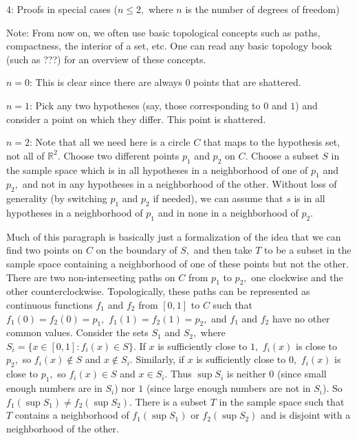 \documentclass{article}
\begin{document}
4: Proofs in special cases ($n \le 2,$ where $n$ is the number of degrees of freedom)

Note: From now on, we often use basic topological concepts such as paths, compactness, the interior of a set, etc. One can read any basic topology book (such as ???) for an overview of these concepts.

$n = 0$: This is clear since there are always $0$ points that are shattered.

$n = 1$: Pick any two hypotheses (say, those corresponding to $0$ and $1$) and consider a point on which they differ. This point is shattered.

$n = 2$: Note that all we need here is a circle $C$ that maps to the hypothesis set, not all of $\mathbb{R}^2.$ Choose two different points $p_1$ and $p_2$ on $C.$ Choose a subset $S$ in the sample space which is in all hypotheses in a neighborhood of one of $p_1$ and $p_2,$ and not in any hypotheses in a neighborhood of the other. Without loss of generality (by switching $p_1$ and $p_2$ if needed), we can assume that $s$ is in all hypotheses in a neighborhood of $p_1$ and in none in a neighborhood of $p_2.$

Much of this paragraph is basically just a formalization of the idea that we can find two points on $C$ on the boundary of $S,$ and then take $T$ to be a subset in the sample space containing a neighborhood of one of these points but not the other. There are two non-intersecting paths on $C$ from $p_1$ to $p_2,$ one clockwise and the other counterclockwise. Topologically, these paths can be represented as continuous functions $f_1$ and $f_2$ from $[0, 1]$ to $C$ such that $f_1(0) = f_2(0) = p_1,$ $f_1(1) = f_2(1) = p_2,$ and $f_1$ and $f_2$ have no other common values. Consider the sets $S_1$ and $S_2,$ where $S_i = \{x \in [0, 1] : f_i(x) \in S\}.$ If $x$ is sufficiently close to $1,$ $f_i(x)$ is close to $p_2,$ so $f_i(x) \notin S$ and $x \notin S_i.$ Similarly, if $x$ is sufficiently close to $0,$ $f_i(x)$ is close to $p_1,$ so $f_i(x) \in S$ and $x \in S_i.$ Thus $\sup S_i$ is neither $0$ (since small enough numbers are in $S_i$) nor $1$ (since large enough numbers are not in $S_i$). So $f_1(\sup S_1) \ne f_2(\sup S_2).$ There is a subset $T$ in the sample space such that $T$ contains a neighborhood of $f_1(\sup S_1)$ or $f_2(\sup S_2)$ and is disjoint with a neighborhood of the other.
\end{document}
